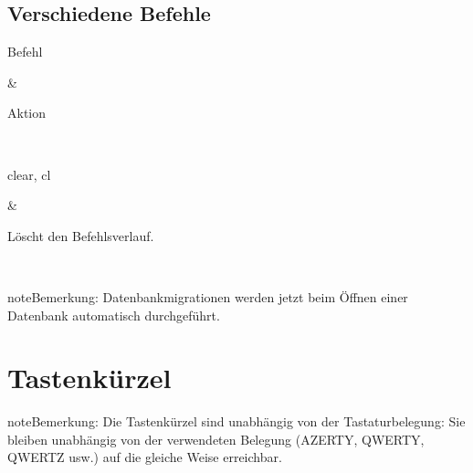 \documentclass[letterpaper,10pt,german]{sphinxmanual}
\begin{document}
\subsection{Verschiedene Befehle}
\label{\detokenize{cmd_mode:commandes-diverses}}\label{\detokenize{cmd_mode:cmd-misc}}

\begin{savenotes}\sphinxattablestart
\sphinxthistablewithglobalstyle
\centering
\begin{tabular}[t]{}
\sphinxtoprule
\begin{varwidth}[t]{}
\sphinxstyletheadfamily \sphinxAtStartPar
Befehl
\sphinxbeforeendvarwidth
\end{varwidth}%
&\begin{varwidth}[t]{}
\sphinxstyletheadfamily \sphinxAtStartPar
Aktion
\sphinxbeforeendvarwidth
\end{varwidth}%
\\
\sphinxmidrule
\sphinxtableatstartofbodyhook\begin{varwidth}[t]{}
\sphinxAtStartPar
clear, cl
\sphinxbeforeendvarwidth
\end{varwidth}%
&\begin{varwidth}[t]{}
\sphinxAtStartPar
Löscht den Befehlsverlauf.
\sphinxbeforeendvarwidth
\end{varwidth}%
\\
\sphinxbottomrule
\end{tabular}
\sphinxtableafterendhook\par
\sphinxattableend\end{savenotes}

\begin{sphinxadmonition}{note}{Bemerkung:}
\sphinxAtStartPar
Datenbankmigrationen werden jetzt beim Öffnen einer Datenbank automatisch durchgeführt.
\end{sphinxadmonition}

\sphinxstepscope


\section{Tastenkürzel}
\label{\detokenize{raccourcis:raccourcis-clavier}}\label{\detokenize{raccourcis:raccourcis}}\label{\detokenize{raccourcis::doc}}
\begin{sphinxadmonition}{note}{Bemerkung:}
\sphinxAtStartPar
Die Tastenkürzel sind unabhängig von der Tastaturbelegung: Sie bleiben unabhängig von der verwendeten Belegung (AZERTY, QWERTY, QWERTZ usw.) auf die gleiche Weise erreichbar.
\end{sphinxadmonition}
\end{document}
